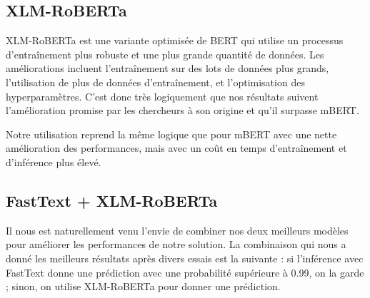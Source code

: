 \subsection{XLM-RoBERTa}

XLM-RoBERTa \cite{conneau2020unsupervised} est une variante optimisée de BERT \cite{devlin2019bert} qui utilise un processus d'entraînement plus robuste et une plus grande quantité de données. Les améliorations incluent l'entraînement sur des lots de données plus grands, l'utilisation de plus de données d'entraînement, et l'optimisation des hyperparamètres. C'est donc très logiquement que nos résultats suivent l'amélioration promise par les chercheurs à son origine et qu'il surpasse mBERT.

Notre utilisation reprend la même logique que pour mBERT avec une nette amélioration des performances, mais avec un coût en temps d'entraînement et d'inférence plus élevé.

\subsection{FastText + XLM-RoBERTa}

Il nous est naturellement venu l'envie de combiner nos deux meilleurs modèles pour améliorer les performances de notre solution. La combinaison qui nous a donné les meilleurs résultats après divers essais est la suivante : si l'inférence avec FastText donne une prédiction avec une probabilité supérieure à 0.99, on la garde ; sinon, on utilise XLM-RoBERTa pour donner une prédiction.